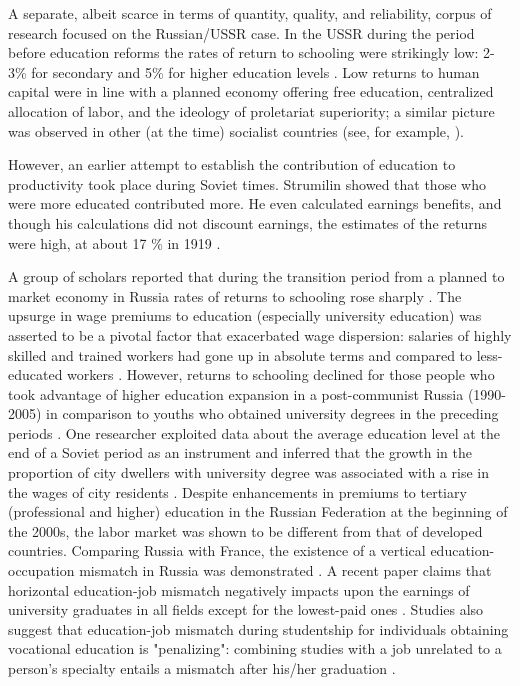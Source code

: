\documentclass[alpha-refs]{wiley-article-01g}
\begin{document}
A separate, albeit scarce in terms of quantity, quality, and reliability, corpus of research focused on the Russian\slash USSR case. In the USSR during the period before education reforms the rates of return to schooling were strikingly low: 2-3\% for secondary and 5\% for higher education levels \parencite{Graeser1988}. Low returns to human capital were in line with a planned economy offering free education, centralized allocation of labor, and the ideology of proletariat superiority; a similar picture was observed in other (at the time) socialist countries (see, for example, \cite{Munich2005}).

However, an earlier attempt to establish the contribution of education to productivity took place during Soviet times. Strumilin showed that those who were more educated contributed more.  He even calculated earnings benefits, and though his calculations did not discount earnings, the estimates of the returns were high, at about 17 \% in 1919 \parencite{Strumilin1924}. 

A group of scholars reported that during the transition period from a planned to market economy in Russia rates of returns to schooling rose sharply \parencite{Brainerd1998,Clark2003,Vernon2002}. The upsurge in wage premiums to education (especially university education) was asserted to be a pivotal factor that exacerbated wage dispersion: salaries of highly skilled and trained workers had gone up in absolute terms and compared to less-educated workers \parencite{Fleisher2005}. However, returns to schooling declined for those people who took advantage of higher education expansion in a post-communist Russia (1990-2005) in comparison to youths who obtained university degrees in the preceding periods \parencite{Kyui2016}. One researcher exploited data about the average education level at the end of a Soviet period as an instrument and inferred that the growth in the proportion of city dwellers with university degree was associated with a rise in the wages of  city residents \parencite{ Muravyev2008}.
Despite enhancements in premiums to tertiary (professional and higher) education in the Russian Federation at the beginning of the 2000s, the labor market was shown to be different from that of developed countries. Comparing Russia with France, the existence of a vertical education-occupation mismatch in Russia was demonstrated \parencite{Kyui2010}. A recent paper claims that horizontal education-job mismatch negatively impacts upon the earnings of university graduates in all fields except for the lowest-paid ones \parencite{Rudakov2019}. Studies also suggest that education-job mismatch during studentship for individuals obtaining vocational education is "penalizing": combining studies with a job unrelated to a person's specialty entails a mismatch after his/her graduation \parencite{Dudyrev2018}.
\end{document}
